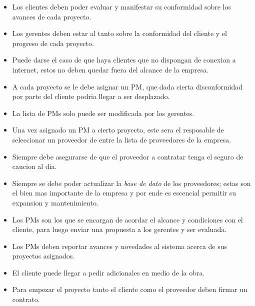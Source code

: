 \begin{itemize}

	\item Los clientes deben poder evaluar y manifestar su conformidad sobre los avances de cada proyecto.
	
	\item Los gerentes deben estar al tanto sobre la conformidad del cliente y el progreso de cada proyecto.
	
  \item Puede darse el caso de que haya clientes que no dispongan de conexion a internet, estos no deben quedar fuera del alcance de la empresa.
  
	\item A cada proyecto se le debe asignar un PM, que dada cierta disconformidad por parte del cliente podria llegar a ser desplazado.
	
	\item La lista de PMs solo puede ser modificada por los gerentes.
	
	\item Una vez asignado un PM a cierto proyecto, este sera el resposable de seleccionar un proveedor de entre la lista de proveedores de la empresa.
	
	\item Siempre debe asegurarse de que el proveedor a contratar tenga el seguro de caucion al dia.
	
  \item Siempre se debe poder actualizar la \textit{base de dato} de los proveedores; estas son el bien mas importante de la empresa y por ende es escencial permitir su expansion y mantenimiento. 

  \item Los PMs son los que se encargan de acordar el alcance y condiciones con el cliente, para luego enviar una propuesta a los gerentes y ser evaluada.
	
  \item Los PMs deben reportar avances y novedades al sistema acerca de sus proyectos asignados.

  \item El cliente puede llegar a pedir adicionales en medio de la obra.

  \item Para empezar el proyecto tanto el cliente como el proveedor deben firmar un contrato. 

\end{itemize}
